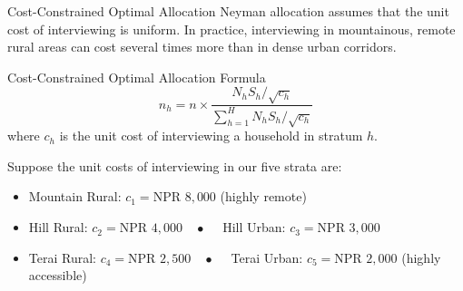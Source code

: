 \documentclass[10pt, aspectratio=169]{beamer}
\begin{document}
  \begin{frame}{Cost-Constrained Optimal Allocation}
      Neyman allocation assumes that the unit cost of interviewing is uniform. In practice, interviewing in mountainous, remote rural areas can cost several times more than in dense urban corridors.
      
      \begin{block}{Cost-Constrained Optimal Allocation Formula}
          $$n_h = n \times \frac{N_h S_h / \sqrt{c_h}}{\sum_{h=1}^H N_h S_h / \sqrt{c_h}}$$
          where $c_h$ is the unit cost of interviewing a household in stratum $h$.
      \end{block}
      
      Suppose the unit costs of interviewing in our five strata are:
      \begin{itemize}
          \item Mountain Rural: $c_1 = \text{NPR } 8,000$ (highly remote)
          \item Hill Rural: $c_2 = \text{NPR } 4,000 \quad \bullet \quad$ Hill Urban: $c_3 = \text{NPR } 3,000$
          \item Terai Rural: $c_4 = \text{NPR } 2,500 \quad \bullet \quad$ Terai Urban: $c_5 = \text{NPR } 2,000$ (highly accessible)
      \end{itemize}
  \end{frame}
  
\end{document}
